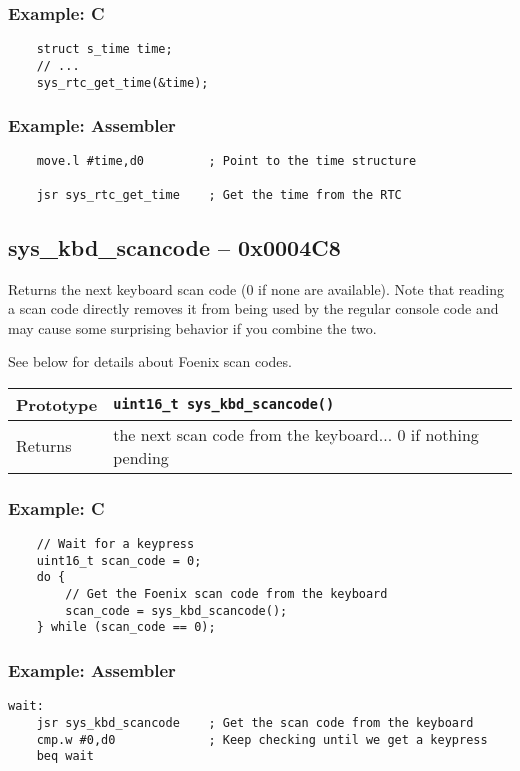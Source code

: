 \subsubsection*{Example: C}
\begin{lstlisting}
    struct s_time time;
    // ...
    sys_rtc_get_time(&time);
\end{lstlisting}

\subsubsection*{Example: Assembler}
\begin{verbatim}
    move.l #time,d0         ; Point to the time structure
	
    jsr sys_rtc_get_time    ; Get the time from the RTC
\end{verbatim}

\subsection*{sys\_kbd\_scancode -- 0x0004C8}
Returns the next keyboard scan code (0 if none are available).
Note that reading a scan code directly removes it from being used by the regular console code and may cause some surprising behavior if you combine the two.

See below for details about Foenix scan codes.

\bigskip

\begin{tabular}{|l||l|} \hline
Prototype & \lstinline!uint16_t sys_kbd_scancode()! \\ \hline
Returns & the next scan code from the keyboard... 0 if nothing pending \\ \hline
\end{tabular}

\subsubsection*{Example: C}
\begin{lstlisting}
    // Wait for a keypress
    uint16_t scan_code = 0;
    do {
        // Get the Foenix scan code from the keyboard
        scan_code = sys_kbd_scancode();
    } while (scan_code == 0);
\end{lstlisting}

\subsubsection*{Example: Assembler}
\begin{verbatim}
wait:
    jsr sys_kbd_scancode    ; Get the scan code from the keyboard
    cmp.w #0,d0             ; Keep checking until we get a keypress
    beq wait
\end{verbatim}


